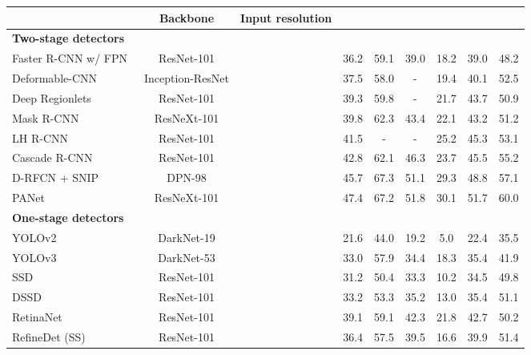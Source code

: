 \documentclass[10pt,twocolumn,letterpaper]{article}
\begin{document}
\setlength{\tabcolsep}{2pt}
\begin{table*}
\begin{center}
\begin{tabular}{l@{\ \ }c@{\ \ \ \ \ }c@{\ \ \ \ \ }c@{\ }c@{\ }c@{\ \ \ \ \ }c@{\ }c@{\ }c}
\toprule
 & Backbone & Input resolution &  &  &  &  &  &  \\
\midrule
        \multicolumn{9}{l}{\textbf{Two-stage detectors}} \\
        Faster R-CNN w/ FPN~\cite{lin2017feature} & ResNet-101 &  & 36.2 &
        59.1 & 39.0 & 18.2 & 39.0 & 48.2\\ 
        Deformable-CNN~\cite{Dai_2017_ICCV} & Inception-ResNet &  & 37.5 &
        58.0 & - & 19.4 & 40.1 & 52.5 \\
        Deep Regionlets~\cite{Xu_2018_ECCV} & ResNet-101 &  & 39.3 & 59.8 & - & 21.7
        & 43.7 & 50.9\\
        Mask R-CNN~\cite{he2017mask} & ResNeXt-101  &  & 39.8 & 62.3 & 43.4 &
        22.1 & 43.2 & 51.2 \\
        LH R-CNN~\cite{li2017light} & ResNet-101 &  & 41.5 & - & - & 25.2 &
        45.3 & 53.1\\
        Cascade R-CNN~\cite{cai2017cascade} & ResNet-101 &  & 42.8 & 62.1 &
        46.3 & 23.7 & 45.5 & 55.2\\
        D-RFCN + SNIP~\cite{singh2018analysis} & DPN-98  &  
        & 45.7 & 67.3 & 51.1 & 29.3 & 48.8 & 57.1 \\
        PANet~\cite{liu2018path} & ResNeXt-101 & 
        & 47.4 & 67.2 & 51.8 & 30.1 & 51.7 & 60.0 \\ 
        \midrule
        \multicolumn{9}{l}{\textbf{One-stage detectors}} \\
        YOLOv2~\cite{redmon2017yolo9000} & DarkNet-19  & & 21.6 & 44.0 & 19.2
        & 5.0 & 22.4 & 35.5 \\
        YOLOv3~\cite{redmon2018yolov3} & DarkNet-53 &  & 33.0 & 57.9 & 34.4
        & 18.3 & 35.4 & 41.9 \\
        SSD~\cite{liu2016ssd} & ResNet-101 &  & 31.2 & 50.4 & 33.3 & 10.2 &
        34.5 & 49.8 \\
        DSSD~\cite{fu2017dssd} & ResNet-101  & & 33.2 & 53.3 & 35.2 & 13.0
        & 35.4 & 51.1\\
        RetinaNet~\cite{lin2018focal} & ResNet-101  & & 39.1 & 59.1 & 42.3
        & 21.8 & 42.7 & 50.2 \\
        RefineDet (SS)~\cite{zhang2018single} & ResNet-101 &  &
        36.4 & 57.5 & 39.5 & 16.6 & 39.9 & 51.4 \\

\end{tabular}
\end{center}
\end{table*}
\end{document}

